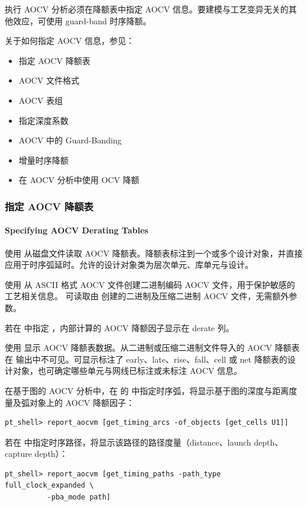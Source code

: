 执行 AOCV 分析必须在降额表中指定 AOCV 信息。要建模与工艺变异无关的其他效应，可使用 guard-band 时序降额。

关于如何指定 AOCV 信息，参见：
\begin{itemize}
  \item 指定 AOCV 降额表
  \item AOCV 文件格式
  \item AOCV 表组
  \item 指定深度系数
  \item AOCV 中的 Guard-Banding
  \item 增量时序降额
  \item 在 AOCV 分析中使用 OCV 降额
\end{itemize}

\subsubsection{指定 AOCV 降额表}
\paragraph*{Specifying AOCV Derating Tables}

使用  从磁盘文件读取 AOCV 降额表。降额表标注到一个或多个设计对象，并直接应用于时序弧延时。允许的设计对象类为层次单元、库单元与设计。

使用  从 ASCII 格式 AOCV 文件创建二进制编码 AOCV 文件，用于保护敏感的工艺相关信息。 可读取由  创建的二进制及压缩二进制 AOCV 文件，无需额外参数。

若在  中指定 ，内部计算的 AOCV 降额因子显示在 derate 列。

使用  显示 AOCV 降额表数据。从二进制或压缩二进制文件导入的 AOCV 降额表在  输出中不可见。可显示标注了 early、late、rise、fall、cell 或 net 降额表的设计对象，也可确定哪些单元与网线已标注或未标注 AOCV 信息。

在基于图的 AOCV 分析中，在  的  中指定时序弧，将显示基于图的深度与距离度量及弧对象上的 AOCV 降额因子：
\begin{lstlisting}
pt_shell> report_aocvm [get_timing_arcs -of_objects [get_cells U1]]
\end{lstlisting}

若在  中指定时序路径，将显示该路径的路径度量（distance、launch depth、capture depth）：
\begin{lstlisting}
pt_shell> report_aocvm [get_timing_paths -path_type full_clock_expanded \
          -pba_mode path]
\end{lstlisting}


